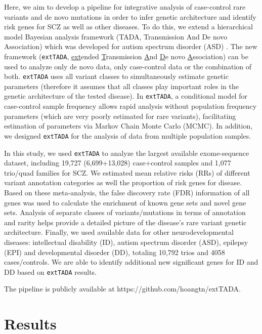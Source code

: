 \documentclass[]{article}
\begin{document}
Here, we aim to develop a pipeline for integrative analysis of case-control
rare variants and de novo mutations in order to infer genetic
architecture and identify risk genes
for SCZ as well as other diseases. To do this, we extend a hierarchical model Bayesian analysis framework
(TADA, Transmission And De novo Association) which was developed for
autism spectrum disorder (ASD) \citep{he2013integrated}. The new
framework (\texttt{extTADA}, \underline{ext}ended \underline{T}ransmission \underline{A}nd \underline{D}e novo \underline{A}ssociation) can
be used to analyze only de novo data, only case-control data or the
combination of both.
\texttt{extTADA} uses all variant classes to
simultaneously estimate genetic parameters (therefore it assumes that all classes play important roles in the genetic architecture of the tested disease). In \texttt{extTADA}, a conditional
model for case-control sample frequency allows rapid analysis without population frequency parameters (which are very poorly estimated for rare variants), facilitating estimation of
parameters via Markov Chain Monte Carlo
(MCMC). In addition, we designed \texttt{extTADA} for the analysis of data from multiple population samples.

In this study, we used \texttt{extTADA} to analyze the largest available exome-sequence dataset, including
19,727 (6,699+13,028) case+control samples and 1,077 trio/quad families for SCZ. We estimated mean relative risks (RRs) of different variant annotation categories as
well the proportion of risk genes for disease. Based on these meta-analysis, the false discovery rate (FDR) information of all genes was used to calculate the enrichment of known gene sets and novel gene sets. Analysis of separate classes of variants/mutations in terms of annotation and rarity helps provide a detailed picture of the disease's rare variant genetic architecture.
Finally, we used available data for other neurodevelopmental diseases: intellectual
disability (ID), autism spectrum disorder (ASD), epilepsy (EPI) and
developmental disorder (DD), totaling 10,792 trios
and 4058 cases/controls. We are able to identify additional new
significant genes for ID and DD based on \texttt{extTADA} results.

The pipeline is publicly available at https://github.com/hoangtn/extTADA.

\section{Results}
\end{document}
